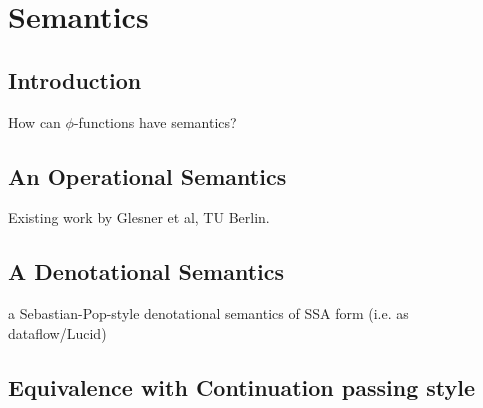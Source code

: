\chapter{Semantics }


\section{Introduction}

How can $\phi$-functions have semantics?


\section{An Operational Semantics}

Existing work by Glesner et al, TU Berlin.


\section{A Denotational Semantics}

a Sebastian-Pop-style denotational semantics of SSA form (i.e. as
dataflow/Lucid)




\section{Equivalence with Continuation passing style}


